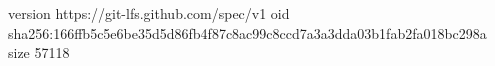 version https://git-lfs.github.com/spec/v1
oid sha256:166ffb5c5e6be35d5d86fb4f87c8ac99c8ccd7a3a3dda03b1fab2fa018bc298a
size 57118
